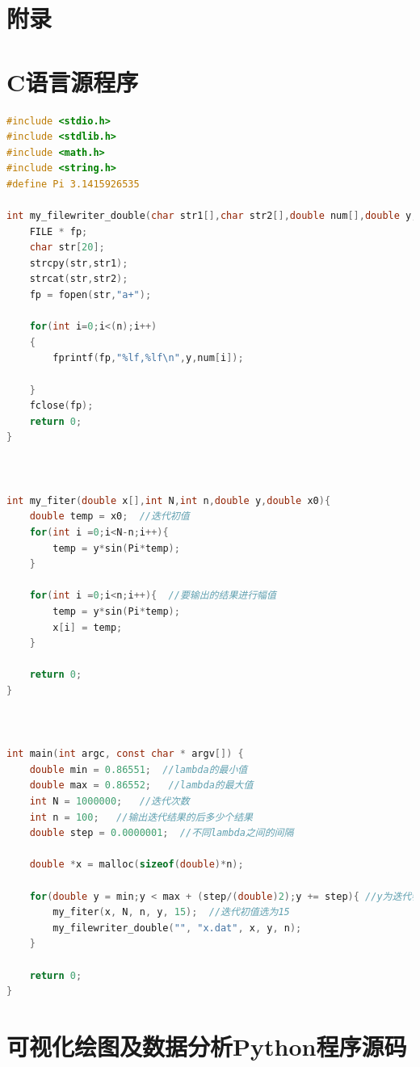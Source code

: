 \documentclass[a4paper,11pt]{article}
\begin{document}
\newpage
\section{附录}

\begin{appendices}

\section{C语言源程序}
\begin{lstlisting}[language = C]
#include <stdio.h>
#include <stdlib.h>
#include <math.h>
#include <string.h>
#define Pi 3.1415926535

int my_filewriter_double(char str1[],char str2[],double num[],double y,int n){
    FILE * fp;
    char str[20];
    strcpy(str,str1);
    strcat(str,str2);
    fp = fopen(str,"a+");

    for(int i=0;i<(n);i++)
    {
        fprintf(fp,"%lf,%lf\n",y,num[i]);

    }
    fclose(fp);
    return 0;
}



int my_fiter(double x[],int N,int n,double y,double x0){
    double temp = x0;  //迭代初值
    for(int i =0;i<N-n;i++){
        temp = y*sin(Pi*temp);
    }
    
    for(int i =0;i<n;i++){  //要输出的结果进行幅值
        temp = y*sin(Pi*temp);
        x[i] = temp;
    }
    
    return 0;
}



int main(int argc, const char * argv[]) {
    double min = 0.86551;  //lambda的最小值
    double max = 0.86552;   //lambda的最大值
    int N = 1000000;   //迭代次数
    int n = 100;   //输出迭代结果的后多少个结果
    double step = 0.0000001;  //不同lambda之间的间隔
    
    double *x = malloc(sizeof(double)*n);
    
    for(double y = min;y < max + (step/(double)2);y += step){ //y为迭代参数lambda
        my_fiter(x, N, n, y, 15);  //迭代初值选为15
        my_filewriter_double("", "x.dat", x, y, n);
    }
    
    return 0;
}

\end{lstlisting}

\newpage

\section{可视化绘图及数据分析Python程序源码}


\end{appendices}
\end{document}
